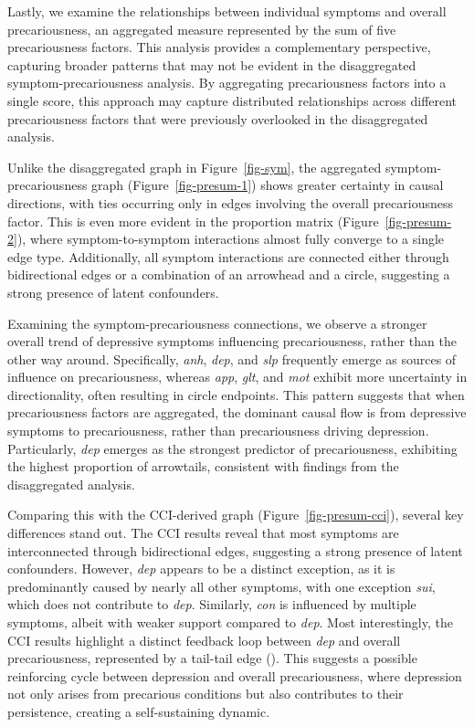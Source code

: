 \documentclass[
]{article}
\begin{document}
Lastly, we examine the relationships between individual symptoms and
overall precariousness, an aggregated measure represented by the sum of
five precariousness factors. This analysis provides a complementary
perspective, capturing broader patterns that may not be evident in the
disaggregated symptom-precariousness analysis. By aggregating
precariousness factors into a single score, this approach may capture
distributed relationships across different precariousness factors that
were previously overlooked in the disaggregated analysis.

Unlike the disaggregated graph in Figure~\ref{fig-sym}, the aggregated
symptom-precariousness graph (Figure~\ref{fig-presum-1}) shows greater
certainty in causal directions, with ties occurring only in edges
involving the overall precariousness factor. This is even more evident
in the proportion matrix (Figure~\ref{fig-presum-2}), where
symptom-to-symptom interactions almost fully converge to a single edge
type. Additionally, all symptom interactions are connected either
through bidirectional edges or a combination of an arrowhead and a
circle, suggesting a strong presence of latent confounders.

Examining the symptom-precariousness connections, we observe a stronger
overall trend of depressive symptoms influencing precariousness, rather
than the other way around. Specifically, \emph{anh}, \emph{dep}, and
\emph{slp} frequently emerge as sources of influence on precariousness,
whereas \emph{app}, \emph{glt}, and \emph{mot} exhibit more uncertainty
in directionality, often resulting in circle endpoints. This pattern
suggests that when precariousness factors are aggregated, the dominant
causal flow is from depressive symptoms to precariousness, rather than
precariousness driving depression. Particularly, \emph{dep} emerges as
the strongest predictor of precariousness, exhibiting the highest
proportion of arrowtails, consistent with findings from the
disaggregated analysis.

Comparing this with the CCI-derived graph (Figure~\ref{fig-presum-cci}),
several key differences stand out. The CCI results reveal that most
symptoms are interconnected through bidirectional edges, suggesting a
strong presence of latent confounders. However, \emph{dep} appears to be
a distinct exception, as it is predominantly caused by nearly all other
symptoms, with one exception \emph{sui}, which does not contribute to
\emph{dep}. Similarly, \emph{con} is influenced by multiple symptoms,
albeit with weaker support compared to \emph{dep}. Most interestingly,
the CCI results highlight a distinct feedback loop between \emph{dep}
and overall precariousness, represented by a tail-tail edge
(\textemdash ). This suggests a possible reinforcing cycle between
depression and overall precariousness, where depression not only arises
from precarious conditions but also contributes to their persistence,
creating a self-sustaining dynamic.
\end{document}
